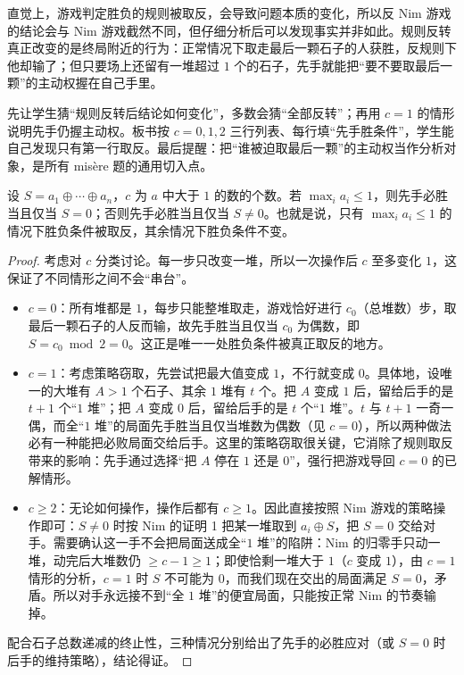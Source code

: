 直觉上，游戏判定胜负的规则被取反，会导致问题本质的变化，所以反 Nim 游戏的结论会与 Nim 游戏截然不同，但仔细分析后可以发现事实并非如此。规则反转真正改变的是终局附近的行为：正常情况下取走最后一颗石子的人获胜，反规则下他却输了；但只要场上还留有一堆超过 $1$ 个的石子，先手就能把“要不要取最后一颗”的主动权握在自己手里。

\begin{teach}[反规则题的教学顺序]
先让学生猜“规则反转后结论如何变化”，多数会猜“全部反转”；再用 $c=1$ 的情形说明先手仍握主动权。板书按 $c=0,1,2$ 三行列表、每行填“先手胜条件”，学生能自己发现只有第一行取反。最后提醒：把“谁被迫取最后一颗”的主动权当作分析对象，是所有 misère 题的通用切入点。
\end{teach}
\begin{theorem}[反 Nim 判定]\label{thm:antinim}
设 $S=a_1\oplus\cdots\oplus a_n$，$c$ 为 $a$ 中大于 $1$ 的数的个数。若 $\max_i a_i\le1$，则先手必胜当且仅当 $S=0$；否则先手必胜当且仅当 $S\ne0$。也就是说，只有 $\max_i a_i\le1$ 的情况下胜负条件被取反，其余情况下胜负条件不变。
\end{theorem}
\begin{proof}
考虑对 $c$ 分类讨论。每一步只改变一堆，所以一次操作后 $c$ 至多变化 $1$，这保证了不同情形之间不会“串台”。
\begin{itemize}
\item $c=0$：所有堆都是 $1$，每步只能整堆取走，游戏恰好进行 $c_0$（总堆数）步，取最后一颗石子的人反而输，故先手胜当且仅当 $c_0$ 为偶数，即 $S=c_0\bmod 2=0$。这正是唯一一处胜负条件被真正取反的地方。
\item $c=1$：考虑策略窃取，先尝试把最大值变成 $1$，不行就变成 $0$。具体地，设唯一的大堆有 $A>1$ 个石子、其余 $1$ 堆有 $t$ 个。把 $A$ 变成 $1$ 后，留给后手的是 $t+1$ 个“$1$ 堆”；把 $A$ 变成 $0$ 后，留给后手的是 $t$ 个“$1$ 堆”。$t$ 与 $t+1$ 一奇一偶，而全“$1$ 堆”的局面先手胜当且仅当堆数为偶数（见 $c=0$），所以两种做法必有一种能把必败局面交给后手。这里的策略窃取很关键，它消除了规则取反带来的影响：先手通过选择“把 $A$ 停在 $1$ 还是 $0$”，强行把游戏导回 $c=0$ 的已解情形。
\item $c\ge2$：无论如何操作，操作后都有 $c\ge1$。因此直接按照 Nim 游戏的策略操作即可：$S\ne0$ 时按 Nim 的证明 1 把某一堆取到 $a_i\oplus S$，把 $S=0$ 交给对手。需要确认这一手不会把局面送成全“$1$ 堆”的陷阱：Nim 的归零手只动一堆，动完后大堆数仍 $\ge c-1\ge1$；即使恰剩一堆大于 $1$（$c$ 变成 $1$），由 $c=1$ 情形的分析，$c=1$ 时 $S$ 不可能为 $0$，而我们现在交出的局面满足 $S=0$，矛盾。所以对手永远接不到“全 $1$ 堆”的便宜局面，只能按正常 Nim 的节奏输掉。
\end{itemize}
配合石子总数递减的终止性，三种情况分别给出了先手的必胜应对（或 $S=0$ 时后手的维持策略），结论得证。
\end{proof}

